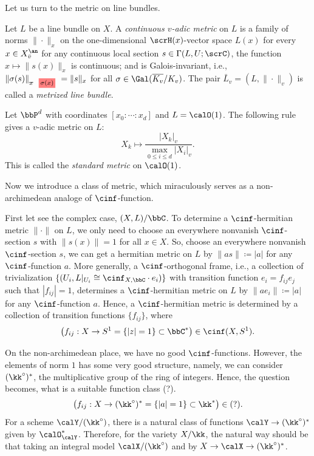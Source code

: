 Let us turn to the metric on line bundles.

\begin{definition}[label=\labelNFM{def:adic-metric}, status=draft, tag=0000000]
	Let $L$ be a line bundle on $X$.
	A \emph{continuous $v$-adic metric} on $L$ is a family of norms $\|\cdot\|_{x}$ on the one-dimensional $\scrH(x)$-vector space $L(x)$ for every $x \in X_{\bar{v}}^\an$ for any continuous local section $s \in \Gamma(L,U;\scrC)$, the function $x \mapsto \|s(x)\|_x$ is continuous;
	and is Galois-invariant, i.e., $\|\sigma(s)\|_{\latexdeletedmath{x}\latexaddedmath{\sigma(x)}} = \|s\|_x$ for all $\sigma \in \Gal(\overline{K_v}/K_v)$.
	The pair $\bar L_v = (L,\|\cdot\|_v)$ is called a \emph{metrized line bundle}.
\end{definition}

\begin{example}[label=\labelNFM{eg:standard-metrics-on-projective-space}, status=draft, tag=0000000]
	Let $\bbP^d$ with coordinates $[x_0:\cdots:x_d]$ and $L = \calO(1)$.
	The following rule gives a $v$-adic metric on $L$:
	\[ X_k \mapsto \frac{|X_k|_v}{\max_{0 \leq i \leq d}|X_i|_v}. \]
	This is called the \emph{standard metric} on $\calO(1)$.
\end{example}

Now we introduce a class of metric, which miraculously serves as a non-archimedean analoge of $\cinf$-function.

First let see the complex case, $(X,L)/\bbC$.
To determine a $\cinf$-hermitian metric $\|\cdot\|$ on $L$, we only need to choose an everywhere nonvanish $\cinf$-section $s$ with $\|s(x)\| = 1$ for all $x \in X$.
So, choose an everywhere nonvanish $\cinf$-section $s$, we can get a hermitian metric on $L$ by $\|as\| \coloneqq |a|$ for any $\cinf$-function $a$.
More generally, a $\cinf$-orthogonal frame, i.e., a collection of trivialization $\{(U_i,L|_{U_i} \cong \cinf_{X,\bbC} \cdot e_i)\}$ with transition function $e_i = f_{ij} e_j$ such that $|f_{ij}|=1$, determines a $\cinf$-hermitian metric on $L$ by $\|ae_i\| \coloneqq |a|$ for any $\cinf$-function $a$.
Hence, a $\cinf$-hermitian metric is determined by a collection of transition functions $\{f_{ij}\}$, where
\[ \bigl( f_{ij}: X \to S^1 = \{|z|=1\} \subset \bbC^* \bigr) \in \cinf(X,S^1). \]

On the non-archimedean place, we have no good $\cinf$-functions.
However, the elements of norm $1$ has some very good structure, namely, we can consider $(\kk^\circ)^*$, the multiplicative group of the ring of integers.
Hence, the question becomes, what is a suitable function class (?).
\[ \bigl( f_{ij}: X \to (\kk^\circ)^* = \{|a|=1\} \subset \kk^*\bigr) \in (?). \]
For a scheme $\calY/(\kk^\circ)$, there is a natural class of functions $\calY \to (\kk^\circ)^*$ given by $\calO_\calY^*$.
Therefore, for the variety $X/\kk$, the natural way should be that taking an integral model $\calX/(\kk^\circ)$ and by $X \to \calX \to (\kk^\circ)^*$.

